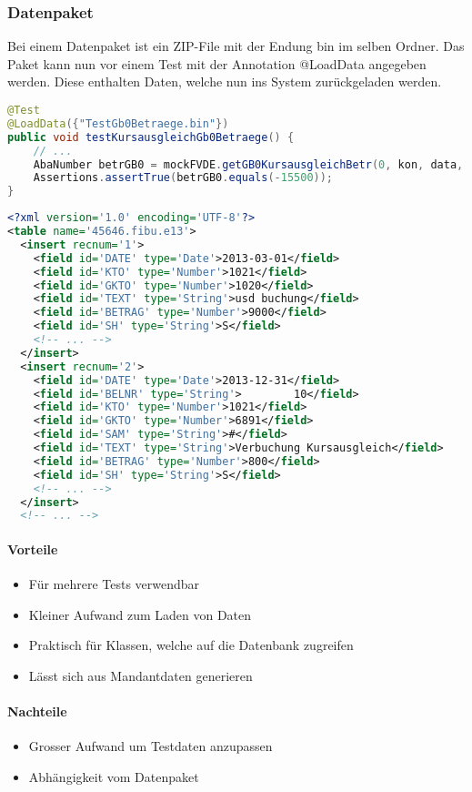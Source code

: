 \subsubsection{Datenpaket} \label{Datenpaket}
Bei einem Datenpaket ist ein ZIP-File mit der Endung bin im selben Ordner. Das Paket kann nun vor einem Test mit der Annotation @LoadData angegeben werden. Diese enthalten Daten, welche nun ins System zurückgeladen werden.
\begin{lstlisting}[language=Java, caption=Beispiel eines Datenpaketes]
@Test
@LoadData({"TestGb0Betraege.bin"})
public void testKursausgleichGb0Betraege() {
	// ...
	AbaNumber betrGB0 = mockFVDE.getGB0KursausgleichBetr(0, kon, data, 1.25, false);
	Assertions.assertTrue(betrGB0.equals(-15500));
}
\end{lstlisting}
\begin{lstlisting}[language=XML, caption=Inhalt einer Datei des Datenpaketes]
<?xml version='1.0' encoding='UTF-8'?>
<table name='45646.fibu.e13'>
  <insert recnum='1'>
    <field id='DATE' type='Date'>2013-03-01</field>
    <field id='KTO' type='Number'>1021</field>
    <field id='GKTO' type='Number'>1020</field>
    <field id='TEXT' type='String'>usd buchung</field>
    <field id='BETRAG' type='Number'>9000</field>
    <field id='SH' type='String'>S</field>
    <!-- ... -->
  </insert>
  <insert recnum='2'>
    <field id='DATE' type='Date'>2013-12-31</field>
    <field id='BELNR' type='String'>        10</field>
    <field id='KTO' type='Number'>1021</field>
    <field id='GKTO' type='Number'>6891</field>
    <field id='SAM' type='String'>#</field>
    <field id='TEXT' type='String'>Verbuchung Kursausgleich</field>
    <field id='BETRAG' type='Number'>800</field>
    <field id='SH' type='String'>S</field>
    <!-- ... -->
  </insert>
  <!-- ... -->
\end{lstlisting}
\paragraph{Vorteile}
\begin{itemize}
\item Für mehrere Tests verwendbar
\item Kleiner Aufwand zum Laden von Daten
\item Praktisch für Klassen, welche auf die Datenbank zugreifen
\item Lässt sich aus Mandantdaten generieren
\end{itemize}
\paragraph{Nachteile}
\begin{itemize}
\item Grosser Aufwand um Testdaten anzupassen
\item Abhängigkeit vom Datenpaket
\end{itemize}

